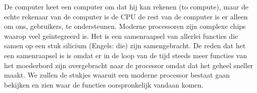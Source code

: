 De computer heet een computer om dat hij kan rekenen (to compute), maar de echte rekenaar van de computer is de CPU de rest van de computer is er alleen om ons, gebruikers, te ondersteunen. Moderne processoren zijn complexe chips waarop veel ge\"integreerd is. Het is een samenraapsel van allerlei functies die samen op een stuk silicium (Engels: die) zijn samengebracht. De reden dat het een samenraapsel is is omdat er in de loop van de tijd steeds meer functies van het moederbord zijn overgebracht naar de processor omdat dat het geheel sneller maakt. We zullen de stukjes waaruit een moderne processor bestaat gaan bekijken en zien waar de functies oorspronkelijk vandaan komen.

